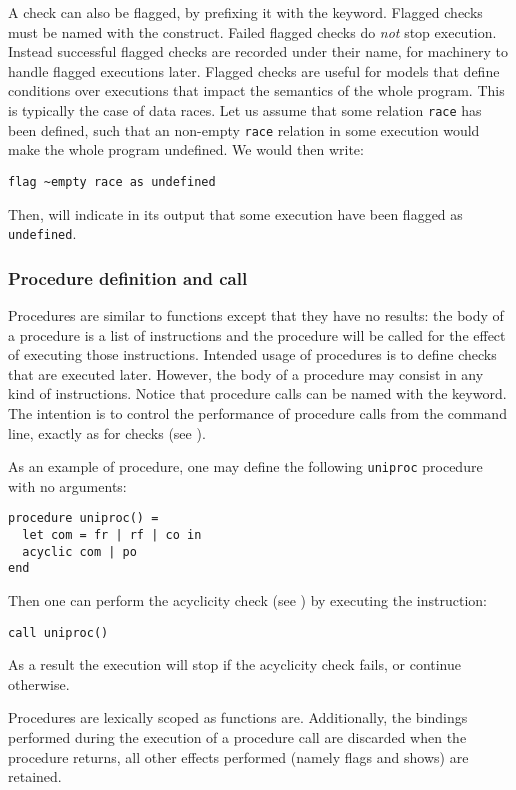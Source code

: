 A check can also be flagged, by prefixing it with the 
keyword. Flagged checks must be named with the  construct.
Failed flagged checks do \emph{not} stop execution.
Instead successful flagged checks are recorded under their name,
for \herd{} machinery to handle flagged executions later.
Flagged checks are useful for models that define conditions
over executions that impact the semantics of the whole program.
This is typically the case of data races.
Let us assume that some relation \verb+race+ has been defined,
such that an non-empty \verb+race+ relation in  some execution
would make the whole program undefined. We would then write:
\begin{verbatim}
flag ~empty race as undefined
\end{verbatim}
Then, \herd{} will indicate in its output that some
execution have been flagged as \verb+undefined+.




\subsubsection*{Procedure definition and call}
Procedures are similar to functions except that they have no results:
the body of a procedure is a list of instructions
and the procedure will be called for the effect of executing
those instructions. Intended usage of procedures is to define checks
that are executed later. However, the body of a procedure may
consist in any kind of instructions.
Notice that procedure calls can be named with the  keyword.
The intention is to control the performance of procedure calls
from  the command line, exactly as for checks (see
).


As an example of procedure,
one may define the following \verb+uniproc+ procedure with
no arguments:
\begin{verbatim}
procedure uniproc() =
  let com = fr | rf | co in
  acyclic com | po
end
\end{verbatim}
Then one can perform the acyclicity check (see
) by executing the instruction:
\begin{verbatim}
call uniproc()
\end{verbatim}
As a result the execution will stop if the acyclicity check fails,
or continue otherwise.

Procedures are lexically scoped as functions are.
Additionally, the bindings performed during the execution of a procedure call
are discarded when the procedure returns, all other effects performed
(namely flags and shows) are retained.

